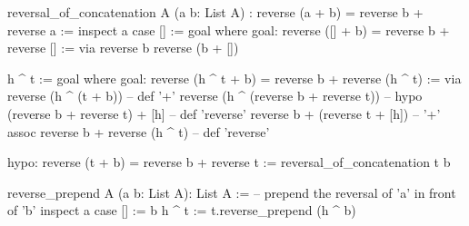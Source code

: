 \begin{alba}
  reversal_of_concatenation
    A
    (a b: List A)
    : reverse (a + b) = reverse b + reverse a :=
      inspect a case
        [] :=
          goal where
            goal: reverse ([] + b) = reverse b + reverse [] :=
              via reverse b
                  reverse (b + [])

        h ^ t :=
          goal where
             goal: reverse (h ^ t + b) = reverse b + reverse (h ^ t) :=
               via
                 reverse (h ^ (t + b))                      -- def '+'
                 reverse (h ^ (reverse b + reverse t))      -- hypo
                 (reverse b + reverse t) + [h]              -- def 'reverse'
                 reverse b + (reverse t + [h])              -- '+' assoc
                 reverse b + reverse (h ^ t)                -- def 'reverse'

             hypo: reverse (t + b) = reverse b + reverse t :=
               reversal_of_concatenation t b
\end{alba}


\begin{alba}
  reverse_prepend A (a b: List A): List A :=
      -- prepend the reversal of 'a' in front of 'b'
    inspect
      a
    case
      [] :=
        b
      h ^ t :=
        t.reverse_prepend (h ^ b)
\end{alba}


